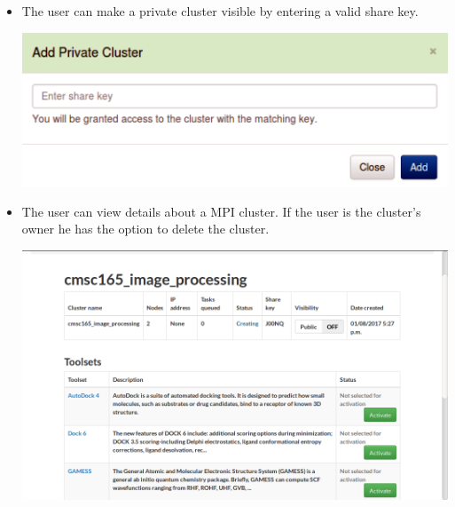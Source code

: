 \begin{itemize}
	
		\item The user can make a private cluster visible by entering a valid share key. \newline
		\begin{center}			
			\includegraphics[scale=0.50]{./images/add_private_cluster_2.png}		
		\end{center}	
		
		\item The user can view details about a MPI cluster. If the user is the cluster's owner he has the option to delete the cluster. \newline
		\begin{center}			
			\includegraphics{./images/n_new_cluster_created_printed}
		\end{center}	
		

\end{itemize}
